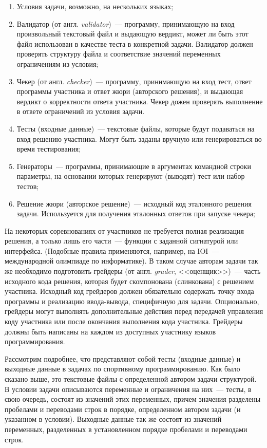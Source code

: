 \documentclass[times,specification,annotation]{style/itmo-student-thesis/itmo-student-thesis}
\begin{document}
\begin{enumerate}
    \item Условия задачи, возможно, на нескольких языках;
    \item Валидатор (от англ. \textit{validator})~--- программу, принимающую на вход произвольный текстовый файл и выдающую вердикт, может ли быть этот файл использован в качестве теста в конкретной задачи. Валидатор должен проверять структуру файла и соответствие значений переменных ограничениям из условия;
    \item Чекер (от англ. \textit{checker})~--- программу, принимающую на вход тест, ответ программы участника и ответ жюри (авторского решения), и выдающая вердикт о корректности ответа участника. Чекер дожен проверять выполнение в ответе ограничений из условия задачи.
    \item Тесты (входные данные)~--- текстовые файлы, которые будут подаваться на вход решению участника. Могут быть заданы вручную или генерироваться во время тестирования;
    \item Генераторы~--- программы, принимающие в аргументах командной строки параметры, на основании которых генерируют (выводят) тест или набор тестов;
    \item Решение жюри (авторское решение)~--- исходный код эталонного решения задачи. Используется для получения эталонных ответов при запуске чекера;
\end{enumerate}

На некоторых соревнованиях от участников не требуется полная реализация решения, а только лишь его части~--- функции с заданной сигнатурой или интерфейса. (Подобные правила применяются, например, на IOI~--- международной олимпиаде по информатике). В таком случае авторам задачи так же необходимо подготовить грейдеры (от англ. \textit{grader}, <<оценщик>>)~--- часть исходного кода решения, которая будет скомпонована (слинкована) с решением участника. Исходный код грейдеров должен обязательно содержать точку входа программы и реализацию ввода-вывода, специфичную для задачи. Опционально, грейдеры могут выполнять дополнительные действия перед передачей управления коду участника или после окончания выполнения кода участника. Грейдеры должны быть написаны на каждом из доступных участнику языков программирования.

Рассмотрим подробнее, что представляют собой тесты (входные данные) и выходные данные в задачах по спортивному программированию. Как было сказано выше, это текстовые файлы с определенной автором задачи структурой. В условии задачи описываются переменные и ограничения на них~--- тесты, в свою очередь, состоят из значений этих переменных, причем значения разделены пробелами и переводами строк в порядке, определенном автором задачи (и указанном в условии). Выходные данные так же состоят из значений переменных, разделенных в установленном порядке пробелами и переводами строк.
\end{document}
